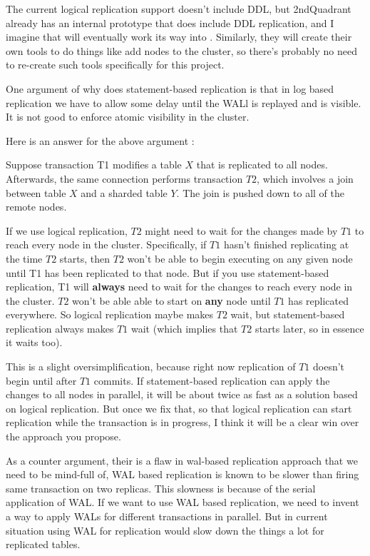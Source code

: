 	The current logical replication support doesn't include DDL, but 2ndQuadrant already has
	an internal prototype that does include DDL replication, and I imagine that will
	eventually work its way into \PG.
	Similarly,  they will create their own tools to do things like add nodes to the cluster,
	so there's probably no need to re-create such tools specifically for this project.

	One argument of why \XC{} does statement-based replication is that in log based
	replication we have to allow some delay until the WALl is replayed and is visible.
	It is not good to enforce atomic visibility in the cluster.

	Here is an answer for the above argument :

	Suppose transaction T1 modifies a table $X$ that is replicated to all nodes.
	Afterwards, the same connection performs transaction $T2$, which involves a join
	between table $X$ and a sharded table $Y$.
	The join is pushed down to all of the remote nodes.

	If we use logical replication, $T2$ might need to wait for the changes made by $T1$
	to reach every node in the cluster.
	Specifically, if $T1$ hasn't finished replicating at the time $T2$ starts, then $T2$
	won't be able to begin executing on any given node until T1 has been replicated
	to that node.
	But if you use statement-based replication, T1 will \textbf{always} need to wait for
	the changes to reach every node in the cluster.
	$T2$ won't be able able to start on \textbf{any} node until $T1$ has replicated everywhere.
	So logical replication maybe makes $T2$ wait, but statement-based replication always
	makes $T1$ wait (which implies that $T2$ starts later, so in essence it waits too).

	This is a slight oversimplification, because right now replication of $T1$ doesn't begin
	until after $T1$ commits.
	If statement-based replication can apply the changes to all nodes in parallel,
	it will be about twice as fast as a solution based on logical replication.
	But once we fix that, so that logical replication can start replication while
	the transaction is in progress, I think it will be a clear win over the approach you propose.

	As a counter argument, their is a flaw in wal-based replication approach that we need
	to be mind-full of,  WAL based replication is known to be slower than firing same
	transaction on two replicas.
	This slowness is because of the serial application of WAL.
	If we want to use WAL based replication, we need to invent a way to apply WALs
	for different transactions in parallel.
	But in current situation using WAL for replication would slow down the things
	a lot for replicated tables.

